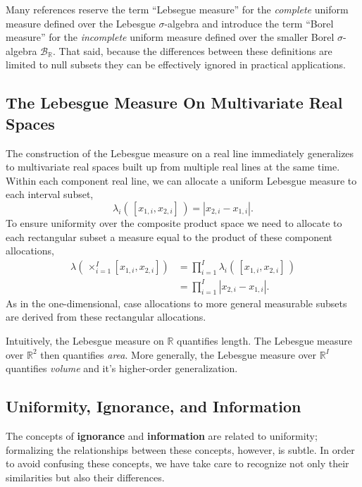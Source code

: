 \documentclass[
  letterpaper,
  DIV=11,
  numbers=noendperiod]{scrartcl}
\begin{document}
Many references reserve the term ``Lebsegue measure'' for the
\emph{complete} uniform measure defined over the Lebesgue
\(\sigma\)-algebra and introduce the term ``Borel measure'' for the
\emph{incomplete} uniform measure defined over the smaller Borel
\(\sigma\)-algebra \(\mathcal{B}_{\mathbb{R}}\). That said, because the
differences between these definitions are limited to null subsets they
can be effectively ignored in practical applications.

\subsection{The Lebesgue Measure On Multivariate Real
Spaces}\label{the-lebesgue-measure-on-multivariate-real-spaces}

The construction of the Lebesgue measure on a real line immediately
generalizes to multivariate real spaces built up from multiple real
lines at the same time. Within each component real line, we can allocate
a uniform Lebesgue measure to each interval subset, \[
\lambda_{i}( \, [x_{1, i}, x_{2, i}] \, )
= | x_{2, i} - x_{1, i} |.
\] To ensure uniformity over the composite product space we need to
allocate to each rectangular subset a measure equal to the product of
these component allocations, \begin{align*}
\lambda( \, \times_{i = 1}^{I} [ x_{1, i}, x_{2, i} ] )
&=
\prod_{i = 1}^{I} \lambda_{i}( \, [x_{1, i}, x_{2, i}] \, )
\\
&=
\prod_{i = 1}^{I} | x_{2, i} - x_{1, i} |.
\end{align*} As in the one-dimensional, case allocations to more general
measurable subsets are derived from these rectangular allocations.

Intuitively, the Lebesgue measure on \(\mathbb{R}\) quantifies length.
The Lebesgue measure over \(\mathbb{R}^{2}\) then quantifies
\emph{area}. More generally, the Lebesgue measure over
\(\mathbb{R}^{I}\) quantifies \emph{volume} and it's higher-order
generalization.

\subsection{Uniformity, Ignorance, and
Information}\label{uniformity-ignorance-and-information}

The concepts of \textbf{ignorance} and \textbf{information} are related
to uniformity; formalizing the relationships between these concepts,
however, is subtle. In order to avoid confusing these concepts, we have
take care to recognize not only their similarities but also their
differences.
\end{document}
